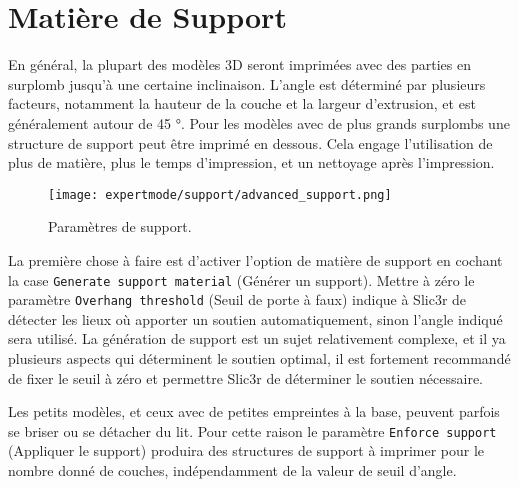 \section{Mati\`ere de Support} %
\label{sec:support}

En g\'en\'eral, la plupart des mod\`eles 3D seront imprim\'ees avec des parties en surplomb jusqu'\`a une certaine inclinaison. L'angle est d\'etermin\'e par plusieurs facteurs, notamment la hauteur de la couche et la largeur d'extrusion, et est g\'en\'eralement autour de 45 °. Pour les mod\`eles avec de plus grands surplombs une structure de support peut \^etre imprim\'e en dessous. Cela engage l'utilisation de plus de mati\`ere, plus le temps d'impression, et un nettoyage apr\`es l'impression.

\begin{figure}[H]
\centering
\texttt{[image: expertmode/support/advanced\_support.png]}
\caption{Param\`etres de support.}
\label{fig:advanced_support}
\end{figure}

La premi\`ere chose \`a faire est d'activer l'option de mati\`ere de support en cochant la case \texttt{Generate support material} (G\'en\'erer un support).  Mettre \`a z\'ero le param\`etre \texttt{Overhang threshold} (Seuil de porte \`a faux) indique \`a Slic3r de d\'etecter les lieux o\`u apporter un soutien automatiquement, sinon l'angle indiqu\'e sera utilis\'e.  La g\'en\'eration de support est un sujet relativement complexe, et il ya plusieurs aspects qui d\'eterminent le soutien optimal, il est fortement recommand\'e de fixer le seuil \`a z\'ero et permettre Slic3r de d\'eterminer le soutien n\'ecessaire.

Les petits mod\`eles, et ceux avec de petites empreintes \`a la base, peuvent parfois se briser ou se d\'etacher du lit.  Pour cette raison le param\`etre \texttt{Enforce support} (Appliquer le support) produira des structures de support \`a imprimer pour le nombre donn\'e de couches, ind\'ependamment de la valeur de seuil d'angle.


